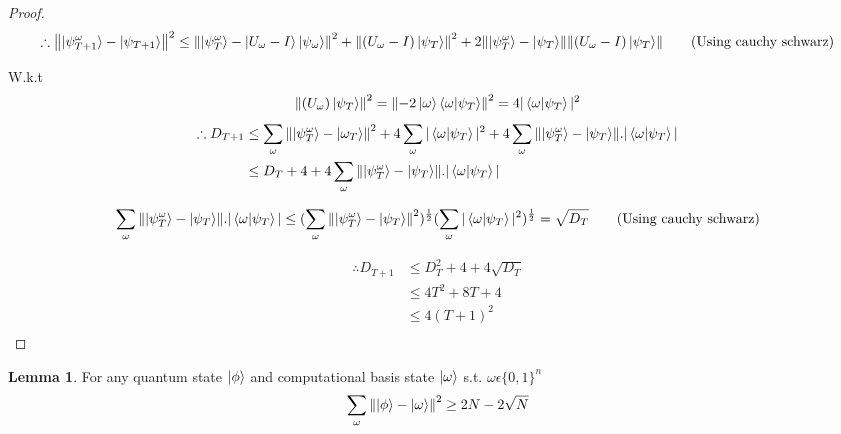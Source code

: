 \documentclass[11.5pt, paper=a4]{article}
\theoremstyle{definition}
\newtheorem{lemma}[theorem]{Lemma}
\numberwithin{theorem}{section}
\begin{document}
\begin{proof}
\begin{equation*}
    \therefore \norm{\ket{\psi^\omega_{T+1}}-\ket{\psi_{T+1}}}^2 \le \norm{\ket{\psi^\omega_T}-\ket{U_\omega-I}\ket{\psi_\omega}}^2 + \norm{(U_\omega - I)\ket{\psi_T}}^2 + 2\norm{\ket{\psi^\omega_T}-\ket{\psi_T}}\norm{(U_\omega-I)\ket{\psi_T}} \tag{Using cauchy schwarz}
\end{equation*}

W.k.t
\begin{equation*}
    \norm{(U_\omega)\ket{\psi_T}}^2 = \norm{-2\ket{\omega}\braket{\omega|\psi_T}}^2 = 4|\braket{\omega|\psi_T}|^2
\end{equation*}
\begin{equation*}
\begin{split}
    \therefore D_{T+1} & \le \sum_\omega\norm{\ket{\psi^\omega_T}-\ket{\omega_T}}^2 + 4\sum_\omega|\braket{\omega|\psi_T}|^2 + 4\sum_\omega\norm{\ket{\psi^\omega_T}-\ket{\psi_T}}.|\braket{\omega|\psi_T}|\\
    & \le D_T + 4 + 4\sum_\omega\norm{\ket{\psi^\omega_T}-\ket{\psi_T}}.|\braket{\omega|\psi_T}|
\end{split}
\end{equation*}

\begin{equation*}
    \sum_\omega\norm{\ket{\psi^\omega_T}-\ket{\psi_T}}.|\braket{\omega|\psi_T}| \le (\sum_\omega\norm{\ket{\psi^\omega_T}-\ket{\psi_T}}^2)^\frac{1}{2}(\sum_\omega|\braket{\omega|\psi_T}|^2)^\frac{1}{2} = \sqrt{D_T} \tag{Using cauchy schwarz}
\end{equation*}

\begin{equation*}
\begin{split}
    \therefore D_{T+1} & \le D^2_T + 4 + 4\sqrt{D_T}\\
    & \le 4T^2 + 8T + 4\\
    & \le 4(T+1)^2\\
\end{split}
\end{equation*}

\end{proof}

\begin{lemma}
\label{lemma:lemma1}
For any quantum state $\ket{\phi}$ and computational basis state $\ket{\omega}$ s.t. $\omega \epsilon \{0,1\}^n$
\begin{equation*}
    \sum_\omega\norm{\ket{\phi}-\ket{\omega}}^2 \ge 2N - 2\sqrt{N}
\end{equation*}
\end{lemma}
\end{document}
